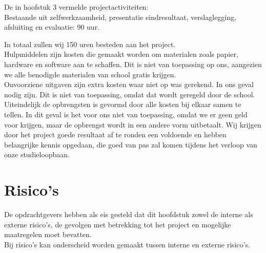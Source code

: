 \documentclass[oneside]{book}
\begin{document}
De in hoofstuk 3 vermelde projectactiviteiten:\\ 
{\color{red}Bestaande uit zelfwerkzaamheid, presentatie eindresultaat, verslaglegging, afsluiting en evaluatie: 90 uur.}

In totaal zullen wij 150 uren besteden aan het project.\\

Hulpmiddelen zijn kosten die gemaakt worden om materialen zoals papier, 
hardware en software aan te schaffen. Dit is niet van toepassing op ons, aangezien
we alle benodigde materialen van school gratis krijgen.\\

{\color{red}Onvoorziene uitgaven zijn extra kosten waar niet op was gerekend. In ons geval}
nodig zijn. Dit is niet van toepassing, omdat dat wordt geregeld door de school.\\

{\color{red}Uiteindelijk de opbrengsten is gevormd door alle kosten bij elkaar
samen te tellen. In dit geval is het voor ons niet van toepassing, omdat
we er geen geld voor krijgen, maar de opbrengst wordt in een andere vorm uitbetaalt. 
Wij krijgen door het project goede resultaat af te ronden een voldoende en hebben belangrijke    
kennis   opgedaan, die goed van pas zal komen tijdens het verloop van onze studieloopbaan.}
\clearpage
\chapter{Risico's}
{\color{red}De opdrachtgevers hebben als eis gesteld dat dit hoofdstuk zowel de interne als externe risico’s, de gevolgen met betrekking tot het project en mogelijke maatregelen moet bevatten.\\

Bij risico's kan onderscheid worden gemaakt tussen interne en externe risico's.}
\end{document}
